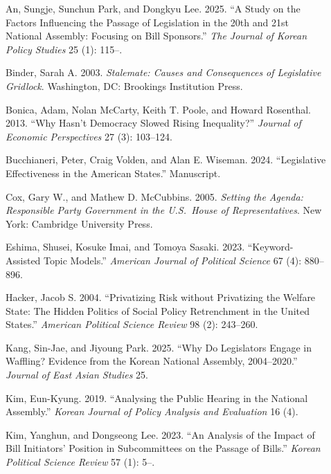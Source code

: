 \documentclass[11pt]{article}
\begin{document}
\begin{description}

\item[] An, Sungje, Sunchun Park, and Dongkyu Lee. 2025. ``A Study on the Factors Influencing the Passage of Legislation in the 20th and 21st National Assembly: Focusing on Bill Sponsors.'' \textit{The Journal of Korean Policy Studies} 25 (1): 115--.

\item[] Binder, Sarah A. 2003. \textit{Stalemate: Causes and Consequences of Legislative Gridlock}. Washington, DC: Brookings Institution Press.

\item[] Bonica, Adam, Nolan McCarty, Keith T. Poole, and Howard Rosenthal. 2013. ``Why Hasn't Democracy Slowed Rising Inequality?'' \textit{Journal of Economic Perspectives} 27 (3): 103--124.

\item[] Bucchianeri, Peter, Craig Volden, and Alan E. Wiseman. 2024. ``Legislative Effectiveness in the American States.'' Manuscript.

\item[] Cox, Gary W., and Mathew D. McCubbins. 2005. \textit{Setting the Agenda: Responsible Party Government in the U.S.\ House of Representatives}. New York: Cambridge University Press.

\item[] Eshima, Shusei, Kosuke Imai, and Tomoya Sasaki. 2023. ``Keyword-Assisted Topic Models.'' \textit{American Journal of Political Science} 67 (4): 880--896.

\item[] Hacker, Jacob S. 2004. ``Privatizing Risk without Privatizing the Welfare State: The Hidden Politics of Social Policy Retrenchment in the United States.'' \textit{American Political Science Review} 98 (2): 243--260.

\item[] Kang, Sin-Jae, and Jiyoung Park. 2025. ``Why Do Legislators Engage in Waffling? Evidence from the Korean National Assembly, 2004--2020.'' \textit{Journal of East Asian Studies} 25.

\item[] Kim, Eun-Kyung. 2019. ``Analysing the Public Hearing in the National Assembly.'' \textit{Korean Journal of Policy Analysis and Evaluation} 16 (4).

\item[] Kim, Yanghun, and Dongseong Lee. 2023. ``An Analysis of the Impact of Bill Initiators' Position in Subcommittees on the Passage of Bills.'' \textit{Korean Political Science Review} 57 (1): 5--.


\end{description}
\end{document}

